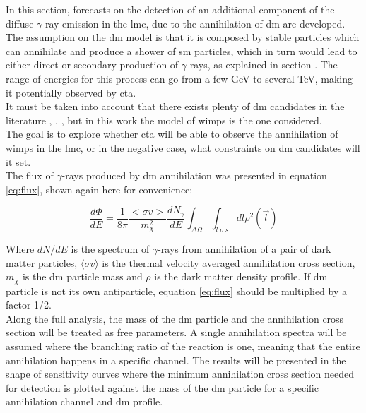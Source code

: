 \documentclass[main.tex]{subfiles}
\begin{document}
In this section, forecasts on the detection of an additional component of the diffuse $\gamma$-ray emission in the \gls{lmc}, due to the annihilation of \gls{dm} are developed. The assumption on the \gls{dm} model is that it is composed by stable particles which can annihilate and produce a shower of \gls{sm} particles, which in turn would lead to either direct or secondary production of $\gamma$-rays, as explained in section \label{sec:DM}. The range of energies for this process can go from a few GeV to several TeV, making it potentially observed by \gls{cta}.\\
It must be taken into account that there exists plenty of \gls{dm} candidates in the literature \cite{2004DMcandidates}, \cite{2005DMcandidates}, \cite{2009DMcandidates}, but in this work the model of \glspl{wimp} is the one considered.\\
The goal is to explore whether \gls{cta} will be able to observe the annihilation of \glspl{wimp} in the \gls{lmc}, or in the negative case, what constraints on \gls{dm} candidates will it set.\\
The flux of $\gamma$-rays produced by \gls{dm} annihilation was presented in equation \ref{eq:flux}, shown again here for convenience:

\begin{equation}
    \frac{d \Phi}{dE}=\frac{1}{8 \pi} \frac{<\sigma v>}{m_{\chi}^2} \frac{d N_{\gamma}}{dE} \int_{\Delta\Omega}\int_{l.o.s} dl \rho^2(\vec{l})
\label{eq:flux}
\end{equation}

Where $dN/dE$ is the spectrum of $\gamma$-rays from annihilation of a pair of dark matter particles, $\langle\sigma v\rangle$ is the thermal velocity averaged annihilation cross section, $m_\chi$ is the \gls{dm} particle mass and $\rho$ is the dark matter density profile. If \gls{dm} particle is not its own antiparticle, equation \ref{eq:flux} should be multiplied by a factor 1/2. \\
Along the full analysis, the mass of the \gls{dm} particle and the annihilation cross section will be treated as free parameters. A single annihilation spectra will be assumed where the branching ratio of the reaction is one, meaning that the entire annihilation happens in a specific channel. The results will be presented in the shape of sensitivity curves where the minimum annihilation cross section needed for detection is plotted against the mass of the \gls{dm} particle for a specific annihilation channel and \gls{dm} profile.
\end{document}
